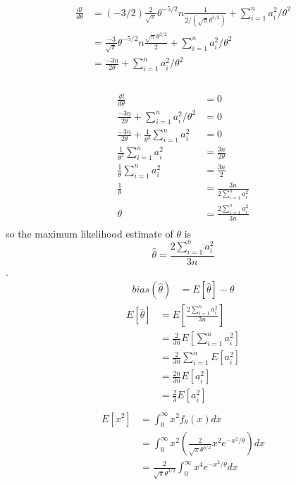 \documentclass[12pt,border=4pt,multi]{article} %
\begin{document}
\begin{align*}
\frac{dl}{d\theta} &= (-3 / 2)\frac{2}{\sqrt{\pi}}\theta^{-5 / 2} n \frac{1}{2 / (\sqrt{\pi}\theta^{3 / 2})} +　\sum_{i = 1}^n a_i^2 / \theta^2\\
&= \frac{-3}{\sqrt{\pi}}\theta^{-5 / 2} n \frac{\sqrt{\pi}\theta^{3 / 2}}{2} + \sum_{i = 1}^n a_i^2 / \theta^2\\
&= \frac{-3n}{2\theta} + \sum_{i = 1}^n a_i^2 / \theta^2\\
\end{align*}\\
\begin{align*}
\frac{dl}{d\theta} &= 0\\
\frac{-3n}{2\theta} + \sum_{i = 1}^n a_i^2 / \theta^2 &= 0\\
\frac{-3n}{2\theta} + \frac{1}{\theta^2}\sum_{i = 1}^n a_i^2 &= 0\\
\frac{1}{\theta^2}\sum_{i = 1}^n a_i^2 &= \frac{3n}{2\theta}\\
\frac{1}{\theta}\sum_{i = 1}^n a_i^2 &= \frac{3n}{2}\\
\frac{1}{\theta} &= \frac{3n}{2\sum_{i = 1}^n a_i^2}\\
\theta &= \frac{2\sum_{i = 1}^n a_i^2}{3n}\\
\end{align*}
so the maximum likelihood estimate of $\theta$ is
\[\hat{\theta} = \frac{2\sum_{i = 1}^n a_i^2}{3n}\]
\newpage
{}.\\
\begin{align*}
bias(\hat{\theta}) &= E[\hat{\theta}] - \theta
\end{align*}
\begin{align*}
E[\hat{\theta}] &= E\left[\frac{2\sum_{i = 1}^n a_i^2}{3n}\right]\\
&= \frac{2}{3n}E[\sum_{i = 1}^n a_i^2]\\
&= \frac{2}{3n}\sum_{i = 1}^n E[a_i^2]\\
&= \frac{2n}{3n} E[a_i^2]\\
&= \frac{2}{3} E[a_i^2]\\
\end{align*}
\begin{align*}
E[x^2] &= \int_0^{\infty} x^2 f_\theta(x) dx\\
&= \int_0^{\infty} x^2 \left(\frac{2}{\sqrt{\pi}\theta^{3 / 2}} x^2 e^{-x^2 / \theta}\right) dx\\
&= \frac{2}{\sqrt{\pi}\theta^{3 / 2}} \int_0^{\infty} x^4 e^{-x^2 / \theta} dx\\
\end{align*}
\end{document}
